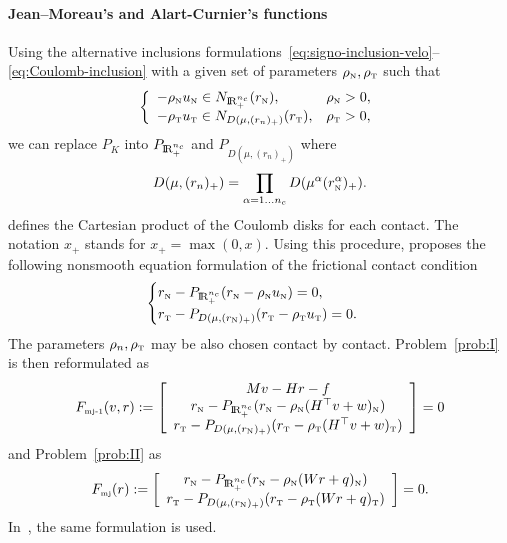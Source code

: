 \paragraph{Jean--Moreau's and Alart-Curnier's functions}

Using the alternative inclusions formulations~\eqref{eq:signo-inclusion-velo}--\eqref{eq:Coulomb-inclusion} with a given set of parameters $\rho_{\hbox{\tiny{N}}},\rho_{\hbox{\tiny{T}}}$ such that
\begin{equation} 
  \label{eq:inclusion-rhorho}
  \left\{ \begin{array}{ll}
    -\rho_\n u_\n \in N_{\RR^{n_c}_+}(r_\n), & \rho_\n>0, \\
    -\rho_\t u_{\t} \in N_{D(\mu,(r_{n})_+)}(r_\t), & \rho_\t>0,
  \end{array}\right.
\end{equation}
 we can replace $P_K$ into $P_{\mathrm{I\!R}^{n_c}_+}$ and $P_{D(\mu,(r_{n})_+)}$ where 
\begin{equation}
  \label{eq:diskR-prod}
  D(\mu,(r_{n})_+) = \prod_{\alpha=1\ldots n_c} D(\mu^{\alpha} (r_{\n}^\alpha)_+).
\end{equation}
defines the Cartesian product of the Coulomb disks for each contact. The notation $x_+$ stands for $x_+ = \max(0,x)$. Using this procedure, \citet{Jean.Moreau1987} proposes the following nonsmooth equation formulation of the frictional contact condition
\begin{equation}
  \label{eq:Moreau--Jean-1}
    \begin{cases}
    r_\n - P_{\RR^{n_c}_+}(r_\n - \rho_\n  u_\n) = 0, \\
    r_\t - P_{D(\mu, (r_{\n})_+)}(r_\t - \rho_\t u_\t   )=0.
  \end{cases}
\end{equation}
The parameters $\rho_n,\rho_{\hbox{\tiny{T}}}$ may be also chosen contact by contact. Problem~\ref{prob:I} is then reformulated as
\begin{equation}
  \label{eq:MJ-I}
  F_{\mjone}(v,r) := \left[
    \begin{array}{c}
    Mv - Hr - f \\
    r_\n - P_{\RR^{n_c}_+}(r_\n - \rho_\n (H^\top v + w)_\n) \\
    r_\t - P_{D(\mu, (r_{\n})_+)}(r_\t - \rho_\t (H^\top v + w)_\t   ) 
  \end{array}\right] =0
\end{equation}
and  Problem~\ref{prob:II}  as
\begin{equation}
  \label{eq:MJ-II}
    F_{\mjtwo}(r) := \left[ \begin{array}{c}
    r_\n - P_{\RR^{n_c}_+}(r_\n - \rho_\n (W r +  q)_\n) \\
    r_\t - P_{D(\mu, (r_{\n})_+)}(r_\t - \rho_\t (Wr+q)_\t   ) 
  \end{array}\right] =0.
\end{equation}
In~\cite{Christensen.Klarbring.ea1998}, the same formulation is used.

